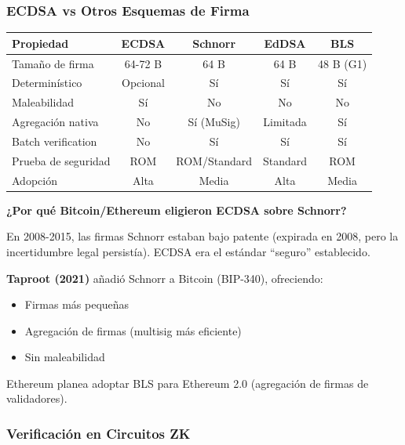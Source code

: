 \documentclass[11pt,a4paper,twoside,openright]{book}
\theoremstyle{definition}
\theoremstyle{plain}
\theoremstyle{remark}
\begin{document}
\subsubsection{ECDSA vs Otros Esquemas de Firma}

\begin{center}
\begin{tabular}{lcccc}
\toprule
\textbf{Propiedad} & \textbf{ECDSA} & \textbf{Schnorr} & \textbf{EdDSA} & \textbf{BLS} \\
\midrule
Tamaño de firma & 64-72 B & 64 B & 64 B & 48 B (G1) \\
Determinístico & Opcional & Sí & Sí & Sí \\
Maleabilidad & Sí & No & No & No \\
Agregación nativa & No & Sí (MuSig) & Limitada & Sí \\
Batch verification & No & Sí & Sí & Sí \\
Prueba de seguridad & ROM & ROM/Standard & Standard & ROM \\
Adopción & Alta & Media & Alta & Media \\
\bottomrule
\end{tabular}
\end{center}

\begin{keyidea}
\textbf{¿Por qué Bitcoin/Ethereum eligieron ECDSA sobre Schnorr?}

En 2008-2015, las firmas Schnorr estaban bajo patente (expirada en 2008, pero la incertidumbre legal persistía). ECDSA era el estándar ``seguro'' establecido.

\textbf{Taproot (2021)} añadió Schnorr a Bitcoin (BIP-340), ofreciendo:
\begin{itemize}
    \item Firmas más pequeñas
    \item Agregación de firmas (multisig más eficiente)
    \item Sin maleabilidad
\end{itemize}

Ethereum planea adoptar BLS para Ethereum 2.0 (agregación de firmas de validadores).
\end{keyidea}

\subsubsection{Verificación en Circuitos ZK}
\end{document}
